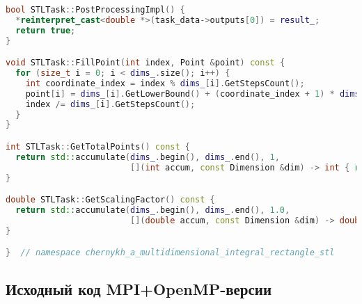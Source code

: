 \documentclass[a4paper,12pt]{article}
\begin{document}
\begin{lstlisting}[language=C++,label={lst:stl}]
bool STLTask::PostProcessingImpl() {
  *reinterpret_cast<double *>(task_data->outputs[0]) = result_;
  return true;
}

void STLTask::FillPoint(int index, Point &point) const {
  for (size_t i = 0; i < dims_.size(); i++) {
    int coordinate_index = index % dims_[i].GetStepsCount();
    point[i] = dims_[i].GetLowerBound() + (coordinate_index + 1) * dims_[i].GetStepSize();
    index /= dims_[i].GetStepsCount();
  }
}

int STLTask::GetTotalPoints() const {
  return std::accumulate(dims_.begin(), dims_.end(), 1,
                         [](int accum, const Dimension &dim) -> int { return accum * dim.GetStepsCount(); });
}

double STLTask::GetScalingFactor() const {
  return std::accumulate(dims_.begin(), dims_.end(), 1.0,
                         [](double accum, const Dimension &dim) -> double { return accum * dim.GetStepSize(); });
}

}  // namespace chernykh_a_multidimensional_integral_rectangle_stl
  \end{lstlisting}

  \subsection{Исходный код MPI+OpenMP-версии}\label{subsec:mpi+openmp}
\end{document}
